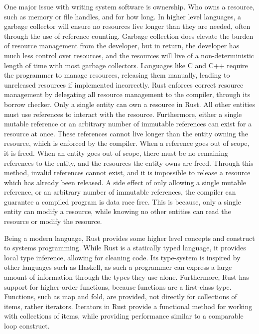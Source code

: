 \documentclass{l4proj}
\begin{document}
One major issue with writing system software is ownership.
Who owns a resource, such as memory or file handles, and for how long.
In higher level languages, a garbage collector will ensure no resources live longer than they are needed, often through
the use of reference counting.
Garbage collection does elevate the burden of resource management from the developer, but in return, the developer has
much less control over resources, and the resources will live of a non-deterministic length of time with most garbage
collectors.
Languages like C and C++ require the programmer to manage resources, releasing them manually, leading to unreleased
resources if implemented incorrectly.
Rust enforces correct resource management by delegating all resource management to the compiler, through its borrow
checker.
Only a single entity can own a resource in Rust.
All other entities must use references to interact with the resource.
Furthermore, either a single mutable reference or an arbitrary number of immutable references can exist for a resource
at once.
These references cannot live longer than the entity owning the resource, which is enforced by the compiler.
When a reference goes out of scope, it is freed.
When an entity goes out of scope, there must be no remaining references to the entity, and the resources the entity owns
are freed.
Through this method, invalid references cannot exist, and it is impossible to release a resource which has already been
released.
A side effect of only allowing a single mutable reference, or an arbitrary number of immutable references, the compiler
can guarantee a compiled program is data race free.
This is because, only a single entity can modify a resource, while knowing no other entities can read the resource or
modify the resource.

Being a modern language, Rust provides some higher level concepts and construct to systems programming.
While Rust is a statically typed language, it provides local type inference, allowing for cleaning code.
Its type-system is inspired by other languages such as Haskell, as such a programmer can express a large amount of
information through the types they use alone.
Furthermore, Rust has support for higher-order functions, because functions are a first-class type.
Functions, such as map and fold, are provided, not directly for collections of items, rather iterators.
Iterators in Rust provide a functional method for working with collections of items, while providing performance similar
to a comparable loop construct.
\end{document}
